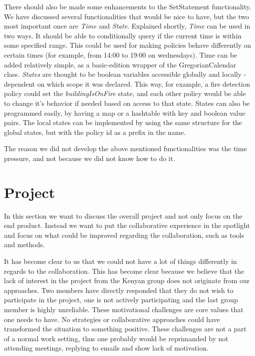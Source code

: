 There should also be made some enhancements to the SetStatement functionality. We have discussed several functionalities that would be nice to have, but the two most important once are \textit{Time} and \textit{State}. Explained shortly, \textit{Time} can be used in two ways. It should be able to conditionally query if the current time is within some specified range. This could be used for making policies behave differently on certain times (for example, from 14:00 to 19:00 on wednesdays). Time can be added relatively simple, as a basic-edition wrapper of the GregorianCalendar class. \textit{States} are thought to be boolean variables accessible globally and locally - dependent on which scope it was declared. This way, for example, a fire detection policy could set the \textit{buildingIsOnFire} state, and each other policy would be able to change it's behavior if needed based on access to that state. States can also be programmed easily, by having a map or a hashtable with key and boolean value pairs. The local states can be implemented by using the same structure for the global states, but with the policy id as a prefix in the name.

The reason we did not develop the above mentioned functionalities was the time pressure, and not because we did not know how to do it.

\section{Project}\label{subsec:project}
In this section we want to discuss the overall project and not only focus on the end product. Instead we want to put the collaborative experience in the spotlight and focus on what could be improved regarding the collaboration, such as tools and methods. 

It has become clear to us that we could not have a lot of things differently in regards to the collaboration. This has become clear because we believe that the lack of interest in the project from the Kenyan group does not originate from our approaches. Two members have directly responded that they do not wish to participate in the project, one is not actively participating and the last group member is highly unreliable. These motivational challenges are core values that one needs to have. No strategies or collaborative approaches could have transformed the situation to something positive. These challenges are not a part of a normal work setting, thus one probably would be reprimanded by not attending meetings, replying to emails and show lack of motivation. 

